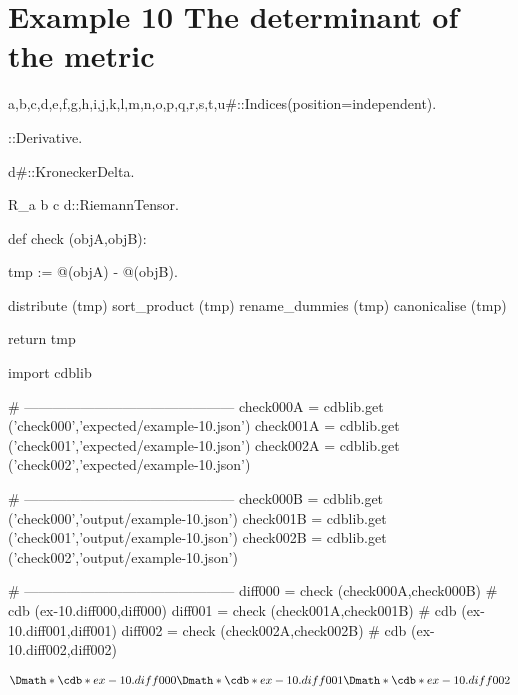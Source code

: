 \documentclass[12pt]{cdblatex}
\begin{document}
\section*{Example 10 The determinant of the metric}


\begin{cadabra}
   {a,b,c,d,e,f,g,h,i,j,k,l,m,n,o,p,q,r,s,t,u#}::Indices(position=independent).

   \nabla{#}::Derivative.

   d{#}::KroneckerDelta.

   R_{a b c d}::RiemannTensor.

   def check (objA,objB):

       tmp := @(objA) - @(objB).

       distribute     (tmp)
       sort_product   (tmp)
       rename_dummies (tmp)
       canonicalise   (tmp)

       return tmp

   import cdblib

   # ---------------------------------------------
   check000A = cdblib.get ('check000','expected/example-10.json')
   check001A = cdblib.get ('check001','expected/example-10.json')
   check002A = cdblib.get ('check002','expected/example-10.json')

   # ---------------------------------------------
   check000B = cdblib.get ('check000','output/example-10.json')
   check001B = cdblib.get ('check001','output/example-10.json')
   check002B = cdblib.get ('check002','output/example-10.json')

   # ---------------------------------------------
   diff000 = check (check000A,check000B)   # cdb (ex-10.diff000,diff000)
   diff001 = check (check001A,check001B)   # cdb (ex-10.diff001,diff001)
   diff002 = check (check002A,check002B)   # cdb (ex-10.diff002,diff002)

\end{cadabra}


\begin{dgroup*}
   \Dmath*{\cdb*{ex-10.diff000}}
   \Dmath*{\cdb*{ex-10.diff001}}
   \Dmath*{\cdb*{ex-10.diff002}}
\end{dgroup*}
\end{document}
